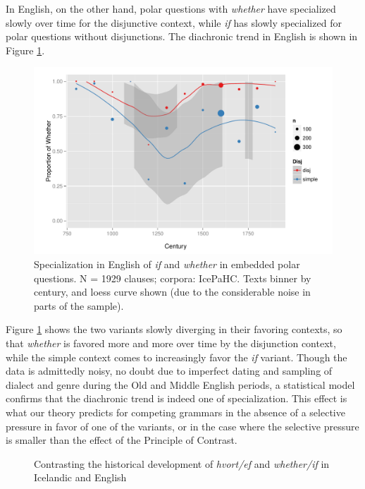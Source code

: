 In English, on the other hand, polar questions with \textsl{whether} have specialized slowly over time for the disjunctive context, while \textsl{if} has slowly specialized for polar questions without disjunctions.
The diachronic trend in English is shown in Figure \ref{whetherfig}.

\begin{figure}
    \begin{center}
    \includegraphics[scale=.7]{whetherifEngLoess.pdf}
    \caption{Specialization in English of \textsl{if} and \textsl{whether} in embedded polar questions. N = 1929 clauses; corpora: IcePaHC. Texts binner by century, and loess curve shown (due to the considerable noise in parts of the sample).}
    \label{whetherfig}
    \end{center}
\end{figure}

Figure \ref{whetherfig} shows the two variants slowly diverging in their favoring contexts, so that \textsl{whether} is favored more and more over time by the disjunction context, while the simple context comes to increasingly favor the \textsl{if} variant.
Though the data is admittedly noisy, no doubt due to imperfect dating and sampling of dialect and genre during the Old and Middle English periods, a statistical model confirms that the diachronic trend is indeed one of specialization. 
This effect is what our theory predicts for competing grammars in the absence of a selective pressure in favor of one of the variants, or in the case where the selective pressure is smaller than the effect of the Principle of Contrast.


\begin{figure}[h!tbp]
	\centering
	\qquad
 \caption{Contrasting the historical development of {\it hvort/ef} and {\it whether/if} in Icelandic and English}
 \label{whether_if_diagram}
\end{figure}

